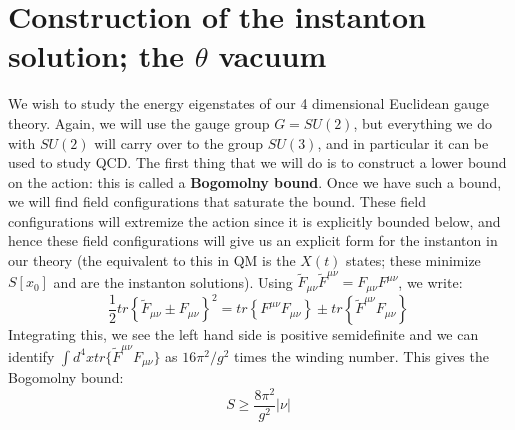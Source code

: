 \documentclass[11pt, oneside]{article}   	%
\theoremstyle{definition}
\begin{document}
\newpage
\section{Construction of the instanton solution; the $\theta$ vacuum}

We wish to study the energy eigenstates of our 4 dimensional Euclidean gauge theory. Again, we will use the gauge group $G = SU(2)$, but everything 
we do with $SU(2)$ will carry over to the group $SU(3)$, and in particular it can be used to study QCD. The first thing that we will do is to construct a 
lower bound on the action: this is called a \textbf{Bogomolny bound}. Once we have such a bound, we will find field configurations that saturate the bound. 
These field configurations will extremize the action since it is explicitly bounded below, and hence these field configurations will give us an explicit form 
for the instanton in our theory (the equivalent to this in QM is the $X(t)$ states; these minimize $S[x_0]$ and are the instanton solutions). Using 
$\tilde F_{\mu\nu} \tilde F^{\mu\nu} = F_{\mu\nu} F^{\mu\nu}$, we write:
\begin{equation}
	\frac{1}{2}tr\left\{\tilde F_{\mu\nu} \pm F_{\mu\nu}\right\}^2 = tr\left\{F^{\mu\nu} F_{\mu\nu}\right\}\pm tr\left\{ \tilde F^{\mu\nu} F_{\mu\nu}\right\}~
	\label{eq:bogomolny_bound_derivation}
\end{equation}
Integrating this, we see the left hand side is positive semidefinite and we can identify $\int d^4 x tr\{\tilde F^{\mu\nu} F_{\mu\nu}\}$ as 
$16\pi^2 / g^2$ times the winding number. This gives the Bogomolny bound:
\begin{equation}
	S\geq \frac{8\pi^2}{g^2} |\nu|~
	\label{eq:bogomolny_bound}
\end{equation}
\end{document}
